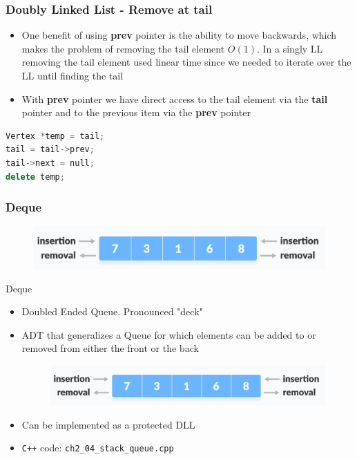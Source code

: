 \documentclass{beamer}
\begin{document}
\begin{frame}[fragile]
\frametitle{Doubly Linked List - Remove at tail}
	\begin{itemize}
		\item One benefit of using \textbf{prev} pointer is the ability to move backwards, which makes the problem of removing the tail element $O(1)$. In a singly LL removing the tail element used linear time since we needed to iterate over the LL until finding the tail
		\item With \textbf{prev} pointer we have direct access to the tail element via the \textbf{tail} pointer and to the previous item via the \textbf{prev} pointer
	\end{itemize}
	\begin{lstlisting}[language=c++]
Vertex *temp = tail;
tail = tail->prev;
tail->next = null;
delete temp;
\end{lstlisting}
\end{frame}


\begin{frame}
\frametitle{Deque}
	\begin{figure}
		\centering
		\includegraphics[scale=0.4]{imgs/2-LDS/deque/deque.png}
	\end{figure}
\end{frame}

\begin{frame}[fragile]{Deque}
    \begin{itemize}
        \item Doubled Ended Queue. Pronounced "deck"
        \item ADT that generalizes a Queue for which elements can be added to or removed from either the front or the back
		\begin{figure}
			\centering
			\includegraphics[scale=0.3]{imgs/2-LDS/deque/deque.png}
		\end{figure}
		\item Can be implemented as a protected DLL
        \item \color{red}\verb|C++| code: \verb|ch2_04_stack_queue.cpp|\color{black}
    \end{itemize}
\end{frame}
\end{document}
